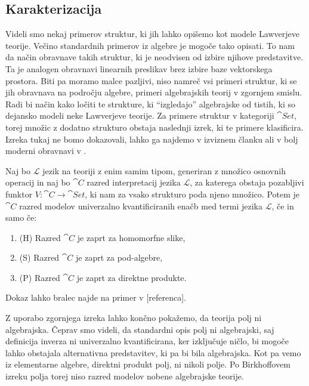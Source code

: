 \documentclass[../kategoricna_logika.tex]{subfiles}
\begin{document}
\subsection{Karakterizacija}
\label{subsec:karakterizacija-lawverjevih-teorij}
%
%
Videli smo nekaj primerov struktur, ki jih lahko opišemo kot modele
Lawverjeve teorije. Večino standardnih primerov iz algebre je mogoče
tako opisati. To nam da način obravnave takih struktur,
ki je neodvisen od izbire njihove predstavitve.
Ta je analogen obravnavi linearnih preslikav brez izbire baze vektorskega
prostora. Biti pa moramo malce pazljivi, niso namreč
vsi primeri struktur, ki se jih obravnava na področju algebre, primeri
algebrajskih teorij v zgornjem smislu. Radi bi način kako ločiti te
strukture, ki "`izgledajo"' algebrajske od tistih, ki so dejansko
modeli neke Lawverjeve teorije. Za primere struktur v kategoriji $\cat{Set}$,
torej množic z dodatno strukturo obstaja naslednji izrek, ki te
primere klasificira. Izreka tukaj ne bomo dokazovali, lahko ga najdemo v
izviznem članku \cite{birkhoff_1935} ali v bolj moderni obravnavi v \cite{cohn1981universal}.
\begin{izrek}\label{izrek:Birkhoff-HSP}
  Naj bo $\mathcal{L}$ jezik na teoriji z enim samim tipom, generiran z množico
  osnovnih operacij in naj bo $\cat{C}$ razred interpretacij jezika $\mathcal{L}$,
  za katerega obstaja pozabljivi funktor $V : \cat{C} \to \cat{Set}$, ki nam za
  vsako strukturo poda njeno množico. Potem je $\cat{C}$ razred modelov
  univerzalno kvantificiranih enačb med termi jezika $\mathcal{L}$, če
  in samo če:
  \begin{enumerate}
  \item (H) Razred $\cat{C}$ je zaprt za homomorfne slike,
  \item (S) Razred $\cat{C}$ je zaprt za pod-algebre, 
  \item (P) Razred $\cat{C}$ je zaprt za direktne produkte.
  \end{enumerate}
\end{izrek}
Dokaz lahko bralec najde na primer v [referenca].
%
\begin{primer}
  Z uporabo zgornjega izreka lahko končno pokažemo, da teorija polj ni algebrajska.
  Čeprav smo videli, da standardni opis polj ni algebrajski, saj definicija inverza
  ni univerzalno kvantificirana, ker izključuje ničlo, bi mogoče lahko obstajala
  alternativna predstavitev, ki pa bi bila algebrajska. Kot pa vemo iz elementarne
  algebre, direktni produkt polj, ni nikoli polje. Po Birkhoffovem izreku polja
  torej niso razred modelov nobene algebrajske teorije.
\end{primer}
\end{document}
